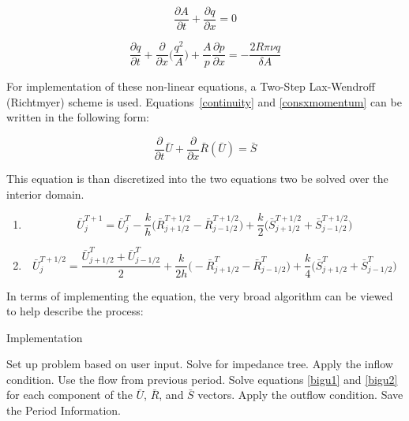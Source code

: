 \documentclass[12pt]{article}
\newcommand{\partder}[2]{\frac{\partial #1}{\partial #2}}
\newcommand{\tensor}[1]{\bar{#1}}
\newcommand{\tensplus}[3]{\tensor{#1}_{#2}^{#3}}
\begin{document}
\begin{equation}
	\label{continuity}
	\partder{A}{t} + \partder{q}{x} = 0
\end{equation}

\begin{equation}
	\label{consxmomentum}
	\partder{q}{t} + \partder{}{x}\Bigg(\frac{q^2}{A}\Bigg) + \frac{A}{p}\partder{p}{x} = -\frac{2R\pi \nu q}{\delta A}
\end{equation}

For implementation of these non-linear equations, a Two-Step Lax-Wendroff (Richtmyer) scheme is used. Equations~\ref{continuity} and \ref{consxmomentum} can be written in the following form:

\begin{equation} 
	\label{discrete1}
	\partder{}{t} \tensor{U} + \partder{}{x} \tensor{R}(\tensor{U}) = \tensor{S}
\end{equation}

This equation is than discretized into the two equations two be solved over the interior domain. 

\begin{enumerate}
	\item
	\begin{equation}
		\label{bigu1}
		\tensplus{U}{j}{T+1} = \tensplus{U}{j}{T} - \frac{k}{h} \Bigg(\tensplus{R}{j+1/2}{T+1/2} - \tensplus{R}{j-1/2}{T+1/2} \Bigg) + \frac{k}{2} \Bigg(\tensplus{S}{j		+1/2}{T+1/2} + \tensplus{S}{j-1/2}{T+1/2} \Bigg)
	\end{equation}
	
	\item
	\begin{equation}
		\label{bigu2}
		\tensplus{U}{j}{T+1/2} = \frac{\tensplus{U}{j+1/2}{T} + \tensplus{U}{j-1/2}{T}}{2} + \frac{k}{2h} \Bigg(-\tensplus{R}{j+1/2}{T} - \tensplus{R}{j-1/2}{T} \Bigg)  		+ \frac{k}{4} \Bigg(\tensplus{S}{j+1/2}{T} + \tensplus{S}{j-1/2}{T} \Bigg)
	\end{equation}
\end{enumerate}

In terms of implementing the equation, the very broad algorithm can be viewed to help describe the process:

\begin{algorithm}
\caption{Implementation}\label{euclid}
\begin{algorithmic}[1]
\State Set up problem based on user input.
\State Solve for impedance tree.
		\State Apply the inflow condition.
	\Else
		\State Use the flow from previous period.
	\EndIf
			\State Solve equations \ref{bigu1} and \ref{bigu2} for each component of the $\tensor{U}$, $\tensor{R}$, and $\tensor{S}$ vectors.
		\EndFor
	\State Apply the outflow condition.
	\EndFor
\State Save the Period Information.
\EndFor
\end{algorithmic}
\end{algorithm}
\end{document}
